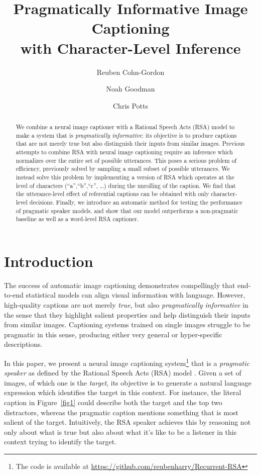 \documentclass[11pt,a4paper]{article}
\title{
Pragmatically Informative Image Captioning\\ with Character-Level Inference
}
\author[ ]{Reuben Cohn-Gordon}
\author[ ]{Noah Goodman}
\author[ ]{Chris Potts}
\affil[ ]{Stanford University}
\affil[ ]{\tt \{reubencg, ngoodman, cgpotts\}@stanford.edu}
\begin{document}
\maketitle


\begin{abstract}

We combine a neural image captioner with a Rational Speech Acts (RSA) model to make a system that is \emph{pragmatically informative}: its objective is to produce captions that are not merely true but also distinguish their inputs from similar images. Previous attempts to combine RSA with neural image captioning require an inference which normalizes over the entire set of possible utterances. This poses a serious problem of efficiency, previously solved by sampling a small subset of possible utterances. We instead solve this problem by implementing a version of RSA which operates at the level of characters (``a'',``b'',``c'', \ldots) during the unrolling of the caption. We find that the utterance-level effect of referential captions can be obtained with only character-level decisions. Finally, we introduce an automatic method for testing the performance of pragmatic speaker models, and show that our model outperforms a non-pragmatic baseline as well as a word-level RSA captioner.
  

\end{abstract}


\section{Introduction}\label{sec:intro}

The success of automatic image captioning
\cite{farhadi2010every,mitchell2012midge,karpathy2015deep,vinyals2015show}
demonstrates compellingly that end-to-end
statistical models can align visual information with language. However,
high-quality captions are not merely \emph{true}, but also
\emph{pragmatically informative} in the sense that they highlight salient properties and help distinguish their inputs from
similar images. Captioning systems trained on single images struggle
to be pragmatic in this sense, producing either very general or
hyper-specific descriptions.

In this paper, we present a neural image captioning system\footnote{The code is available at \url{https://github.com/reubenharry/Recurrent-RSA}} that is a
\emph{pragmatic speaker} as defined by the Rational Speech Acts (RSA)
model \cite{Frank:Goodman:2012,goodman2}. Given a set of images, of
which one is the \emph{target}, its objective is to generate a natural
language expression which identifies the target in this
context. For instance, the literal caption in Figure~\ref{fig1} could describe both the target and the top two distractors, whereas the pragmatic caption mentions something that is most salient of the target. Intuitively, the RSA speaker achieves this by
reasoning not only about what is true but also about what it's like to
be a listener in this context trying to identify the target.
\end{document}
